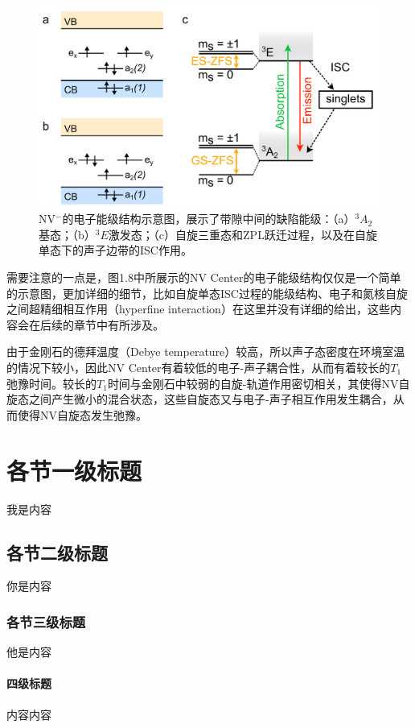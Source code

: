 \documentclass[type = bachelor]{whu-thesis}
\begin{document}
\begin{figure}
  \centering
  \includegraphics[width=1.0\textwidth]{figures/Chapter 1/Electronic Structure.png}
  \caption[NV$^-$的电子能级结构示意图]{NV$^-$的电子能级结构示意图，展示了带隙中间的缺陷能级：（a）$^3A_2$基态；（b）$^3E$激发态；（c）自旋三重态和ZPL跃迁过程，以及在自旋单态下的声子边带的ISC作用。}
  \label{fig: NV Spectrum}
\end{figure}

需要注意的一点是，图1.8中所展示的NV Center的电子能级结构仅仅是一个简单的示意图，更加详细的细节，比如自旋单态ISC过程的能级结构、电子和氮核自旋之间超精细相互作用（hyperfine interaction）在这里并没有详细的给出，这些内容会在后续的章节中有所涉及。

由于金刚石的德拜温度（Debye temperature）较高，所以声子态密度在环境室温的情况下较小，因此NV Center有着较低的电子-声子耦合性，从而有着较长的$T_1$弛豫时间\cite{koizumi2008physics}。较长的$T_1$时间与金刚石中较弱的自旋-轨道作用密切相关，其使得NV自旋态之间产生微小的混合状态，这些自旋态又与电子-声子相互作用发生耦合，从而使得NV自旋态发生弛豫。


\section{各节一级标题}
我是内容

\subsection{各节二级标题}
你是内容

\subsubsection{各节三级标题}
他是内容

\paragraph{四级标题}
内容内容
\end{document}
